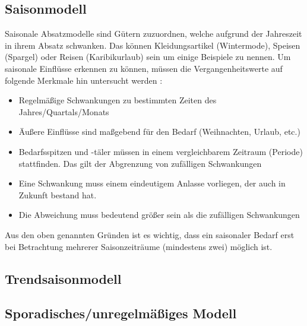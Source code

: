 \subsection{Saisonmodell}
Saisonale Absatzmodelle sind Gütern zuzuordnen, welche aufgrund der Jahreszeit in ihrem Absatz schwanken. Das können Kleidungsartikel (Wintermode), Speisen (Spargel) oder Reisen (Karibikurlaub) sein um einige Beispiele zu nennen.
Um saisonale Einflüsse erkennen zu können, müssen die Vergangenheitswerte auf folgende Merkmale hin untersucht werden \cite[S.~25]{Larouque2010}:
\begin{itemize}
	\item Regelmäßige Schwankungen zu bestimmten Zeiten des Jahres/Quartals/Monats
	\item Äußere Einflüsse sind maßgebend für den Bedarf (Weihnachten, Urlaub, etc.)
	\item Bedarfsspitzen und -täler müssen in einem vergleichbarem Zeitraum (Periode) stattfinden. Das gilt der Abgrenzung von zufälligen Schwankungen
	\item Eine Schwankung muss einem eindeutigem Anlasse vorliegen, der auch in Zukunft bestand hat.
	\item Die Abweichung muss bedeutend größer sein als die zufälligen Schwankungen
\end{itemize}
Aus den oben genannten Gründen ist es wichtig, dass ein saisonaler Bedarf erst bei Betrachtung mehrerer Saisonzeiträume (mindestens zwei) möglich ist.

\subsection{Trendsaisonmodell}

\subsection{Sporadisches/unregelmäßiges Modell}